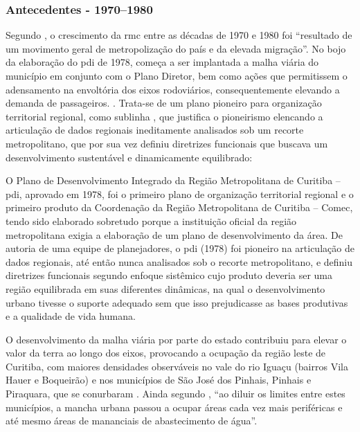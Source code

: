 	\subsubsection{Antecedentes - 1970--1980} \label{sec:ocup1970}
	Segundo , o crescimento da \glsdesc{rmc} entre as décadas de 1970 e 1980 foi ``resultado de um movimento geral de metropolização do país e da elevada migração''. No bojo da elaboração do \gls{pdi} de 1978, começa a ser implantada a malha viária do município em conjunto com o Plano Diretor, bem como ações que permitissem o adensamento na envoltória dos eixos rodoviários, consequentemente elevando a demanda de passageiros. \cite[p. 53]{castro2005a}. Trata-se de um plano pioneiro para organização territorial regional, como sublinha , que justifica o pioneirismo elencando a articulação de dados regionais ineditamente analisados sob um recorte metropolitano, que por sua vez definiu diretrizes funcionais que buscava um desenvolvimento sustentável e dinamicamente equilibrado:
	
	\begin{citacao}
		O Plano de Desenvolvimento Integrado da Região Metropolitana de Curitiba – \gls{pdi}, aprovado em 1978, foi o primeiro plano de organização territorial regional e o primeiro produto da Coordenação da Região Metropolitana de Curitiba – Comec, tendo sido elaborado sobretudo porque a instituição oficial da região metropolitana exigia a elaboração de um plano de desenvolvimento da área. De autoria de uma equipe de planejadores, o \gls{pdi} (1978) foi pioneiro na articulação de dados regionais, até então nunca analisados sob o recorte metropolitano, e definiu diretrizes funcionais segundo enfoque sistêmico cujo produto deveria ser uma região equilibrada em suas diferentes dinâmicas, na qual o desenvolvimento urbano tivesse o suporte adequado sem que isso prejudicasse as bases produtivas e a qualidade de vida humana.
	\end{citacao}
	
	O desenvolvimento da malha viária por parte do estado contribuiu para elevar o valor da terra ao longo dos eixos, provocando a ocupação da região leste de Curitiba, com maiores densidades observáveis no vale do rio Iguaçu (bairros Vila Hauer e Boqueirão) e nos municípios de São José dos Pinhais, Pinhais e Piraquara, que se conurbaram \cite[p. 54]{castro2005a}. Ainda segundo , ``ao diluir os limites entre estes municípios, a mancha urbana passou a ocupar áreas cada vez mais periféricas e até mesmo áreas de mananciais de abastecimento de água''.
	

